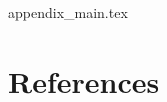 \documentclass[12pt]{article}
\begin{document}






{appendix_main.tex}
\clearpage
\section{References}


\end{document}
